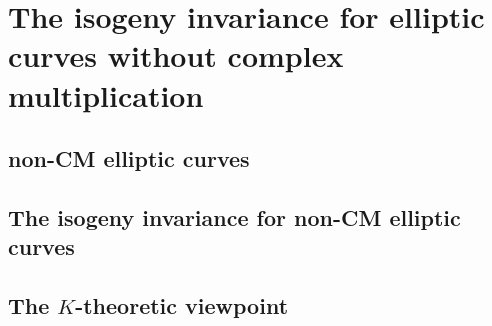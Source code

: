 
\chapter{The isogeny invariance for elliptic curves without complex multiplication}
\label{chap1}

\tab


\tab

\section{non-CM elliptic curves}


\newpage
\section{The isogeny invariance for non-CM elliptic curves}

\newpage
\section{The $K$-theoretic viewpoint}


\endinput

Any text after an \endinput is ignored.
You could put scraps here or things in progress.
